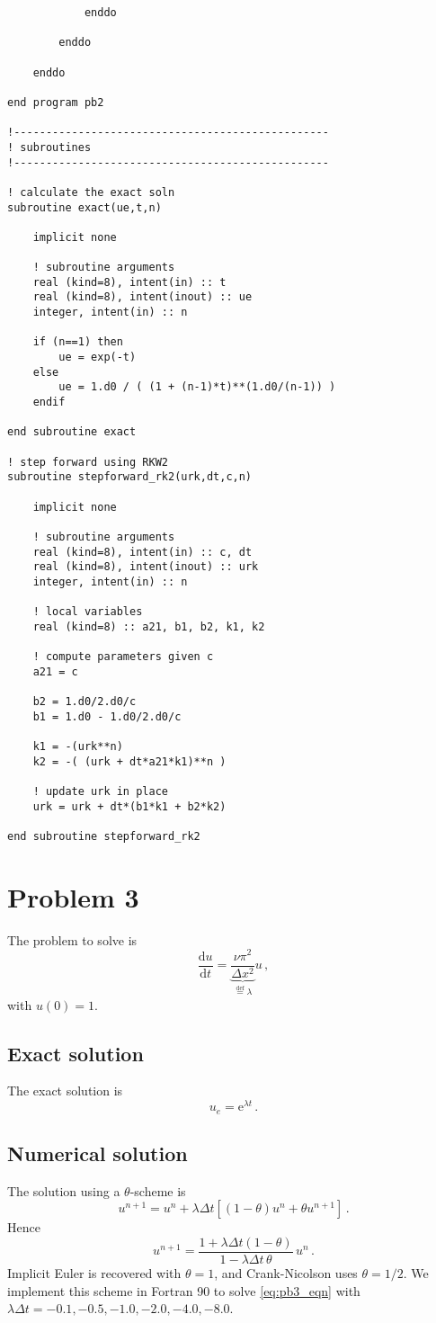 \documentclass[11pt]{article}
\newcommand{\defn}{\stackrel{\text{def}}{=}}
\newcommand{\dd}{\mathrm{d}}
\newcommand{\ee}{\mathrm{e}}
\newcommand{\dt}{\Delta t}
\newcommand{\dx}{\Delta x}
\newcommand{\com}{\, ,}
\newcommand{\per}{\, .}
\def\beq{\begin{equation}}
\def\eeq{\end{equation}}
\begin{document}
\begin{lstlisting}
            enddo

        enddo

    enddo

end program pb2

!-------------------------------------------------
! subroutines 
!-------------------------------------------------

! calculate the exact soln
subroutine exact(ue,t,n)

    implicit none
    
    ! subroutine arguments
    real (kind=8), intent(in) :: t
    real (kind=8), intent(inout) :: ue
    integer, intent(in) :: n
        
    if (n==1) then
        ue = exp(-t)
    else
        ue = 1.d0 / ( (1 + (n-1)*t)**(1.d0/(n-1)) )
    endif

end subroutine exact

! step forward using RKW2
subroutine stepforward_rk2(urk,dt,c,n)

    implicit none

    ! subroutine arguments
    real (kind=8), intent(in) :: c, dt
    real (kind=8), intent(inout) :: urk
    integer, intent(in) :: n

    ! local variables
    real (kind=8) :: a21, b1, b2, k1, k2
    
    ! compute parameters given c
    a21 = c

    b2 = 1.d0/2.d0/c
    b1 = 1.d0 - 1.d0/2.d0/c

    k1 = -(urk**n)
    k2 = -( (urk + dt*a21*k1)**n )

    ! update urk in place
    urk = urk + dt*(b1*k1 + b2*k2)

end subroutine stepforward_rk2
\end{lstlisting}


\section*{Problem 3}
The problem to solve is
\beq
\label{eq:pb3_eqn}
\frac{\dd u}{\dd t} = \underbrace{\frac{\nu \pi^2}{\dx^2}}_{\defn \lambda} u\com
\eeq
with $u(0)=1$.
\subsection*{Exact solution}
The exact solution is
\beq
u_e = \ee^{\lambda t}\per
\eeq
\subsection*{Numerical solution}
The solution using a $\theta$-scheme is
\beq
\label{eq:th_soln}
u^{n+1} = u^n +  \lambda \dt [(1-\theta) u^n + \theta u^{n+1}]\per
\eeq
Hence
\beq
\label{eq:th_soln2}
u^{n+1} = \frac{1 + \lambda \dt (1-\theta)}{1-\lambda \dt \, \theta}\,u^n\per
\eeq
Implicit Euler is recovered with $\theta=1$, and Crank-Nicolson uses $\theta=1/2$. We implement this scheme in Fortran 90 to solve \eqref{eq:pb3_eqn} with $\lambda \dt = -0.1,-0.5,-1.0,-2.0,-4.0,-8.0$.
\end{document}
